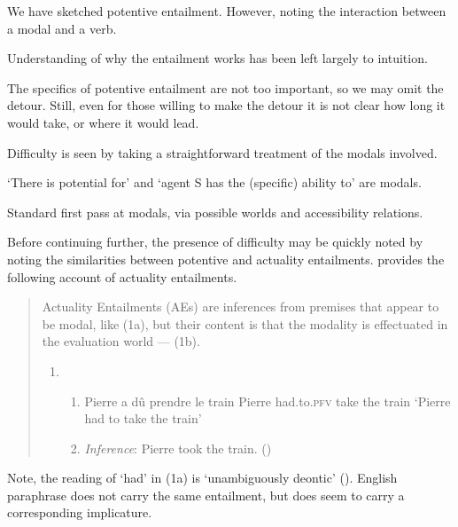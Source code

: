 \begin{note}
  We have sketched potentive entailment.
  However, noting the interaction between a modal and a verb.

  Understanding of why the entailment works has been left largely to intuition.

  The specifics of potentive entailment are not too important, so we may omit the detour.
  Still, even for those willing to make the detour it is not clear how long it would take, or where it would lead.

  Difficulty is seen by taking a straightforward treatment of the modals involved.

  `There is potential for' and `agent S has the (specific) ability to' are modals.

  Standard first pass at modals, via possible worlds and accessibility relations.

  Before continuing further, the presence of difficulty may be quickly noted by noting the similarities between potentive and actuality entailments.
  \textcite{Alxatib:2019wf} provides the following account of actuality entailments.
  \begin{quote}
    Actuality Entailments (AEs) are inferences from premises that appear to be modal, like (1a), but their content is that the modality is effectuated in the evaluation world --- (1b).

    \begin{enumerate}[label=(\arabic*)]
    \item
      \begin{enumerate}[label=\alph*.]
      \item Pierre a dû \hspace{26pt} prendre le \hspace{3.5pt} train \newline
        Pierre had.to.\textsc{pfv} take \hspace{14pt} the train\newline
        \hspace{-4pt} ‘Pierre had to take the train’
      \item \emph{Inference}: Pierre took the train.\nolinebreak
    \mbox{}\hfill\mbox{(\citeyear[701]{Alxatib:2019wf})}
      \end{enumerate}
    \end{enumerate}
  \end{quote}

  Note, the reading of `had' in (1a) is `unambiguously deontic' (\citeyear[703]{Alxatib:2019wf}).
  English paraphrase does not carry the same entailment, but does seem to carry a corresponding implicature.


\end{note}
